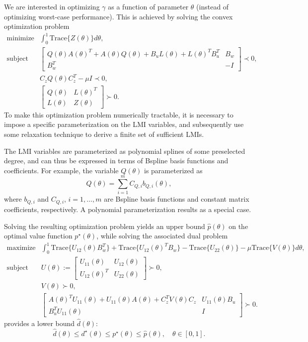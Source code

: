 \documentclass{article}
\newcommand{\ppar}{\theta}                  %
\begin{document}
We are interested in optimizing $\gamma$ as a function of parameter $\ppar$ (instead of optimizing worst-case performance). This is achieved by solving the convex optimization problem
\begin{eqnarray*}
 \text{minimize} & \int_0^1 \text{Trace}\{Z(\ppar)\} d\ppar, \\
 \text{subject to} & \left[ \begin{array}{cc} Q(\ppar)A(\ppar)^T + A(\ppar)Q(\ppar) + B_u L(\ppar) + L(\ppar)^T B_u^T & B_w \\ B_w^T & -I \end{array} \right] \prec 0, \\
 & C_z Q(\ppar) C_z^T - \mu I \prec 0, \\
 & \left[ \begin{array}{cc} Q(\ppar) & L(\ppar)^T \\ L(\ppar) & Z(\ppar) \end{array} \right] \succ 0.
\end{eqnarray*}
To make this optimization problem numerically tractable, it is necessary to impose a specific parameterization on the LMI variables, and subsequently use some relaxation technique to derive a finite set of sufficient LMIs.

The LMI variables are parameterized as polynomial splines of some preselected degree, and can thus be expressed in terms of Bspline basis functions and coefficients. For example, the variable $Q(\ppar)$ is parameterized as
\begin{equation*}
	Q(\ppar) = \sum_{i=1}^m C_{Q,i} b_{Q,i}(\ppar),
\end{equation*}
where $b_{Q,i}$ and $C_{Q,i}$, $i = 1,\dots,m$ are Bspline basis functions and constant matrix coefficients, respectively. A polynomial parameterization results as a special case.

Solving the resulting optimization problem yields an upper bound $\hat{p}(\ppar)$ on the optimal value function $p^{\star}(\ppar)$, while solving the associated dual problem
\begin{eqnarray*}
 \text{maximize} & \int_0^1 \text{Trace}\{U_{12}(\ppar)B_w^T\} + \text{Trace}\{U_{12}(\ppar)^T B_w\} - \text{Trace}\{U_{22}(\ppar)\} - \mu \text{Trace}\{V(\ppar)\}d\ppar, \\
 \text{subject to} & U(\ppar) := \left[ \begin{array}{cc} U_{11}(\ppar) & U_{12}(\ppar) \\ U_{12}(\ppar)^T & U_{22}(\ppar) \end{array} \right] \succ 0, \\
 & V(\ppar) \succ 0, \\
 & \left[ \begin{array}{cc} A(\ppar)^T U_{11}(\ppar) + U_{11}(\ppar)A(\ppar) + C_z^T V(\ppar) C_z & U_{11}(\ppar)B_u \\ B_u^T U_{11}(\ppar) & I \end{array} \right] \succ 0.
\end{eqnarray*}
provides a lower bound $\hat{d}(\ppar)$:
\begin{equation*}
 \hat{d}(\ppar) \leq d^{\star}(\ppar) \leq p^{\star}(\ppar) \leq \hat{p}(\ppar), \quad \ppar \in [0,1].
\end{equation*}
\end{document}

